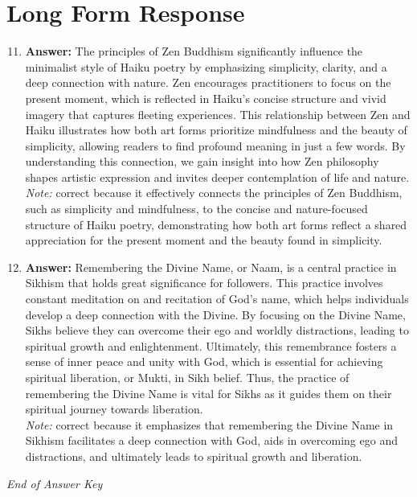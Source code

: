\documentclass[12pt]{article}
\begin{document}
\section*{Long Form Response}
\begin{enumerate}[label=\arabic*.]
\setcounter{enumi}{10}
\item \textbf{Answer:} The principles of Zen Buddhism significantly influence the minimalist style of Haiku poetry by emphasizing simplicity, clarity, and a deep connection with nature. Zen encourages practitioners to focus on the present moment, which is reflected in Haiku's concise structure and vivid imagery that captures fleeting experiences. This relationship between Zen and Haiku illustrates how both art forms prioritize mindfulness and the beauty of simplicity, allowing readers to find profound meaning in just a few words. By understanding this connection, we gain insight into how Zen philosophy shapes artistic expression and invites deeper contemplation of life and nature.
\\ \textit{Note:} correct because it effectively connects the principles of Zen Buddhism, such as simplicity and mindfulness, to the concise and nature-focused structure of Haiku poetry, demonstrating how both art forms reflect a shared appreciation for the present moment and the beauty found in simplicity.
\item \textbf{Answer:} Remembering the Divine Name, or Naam, is a central practice in Sikhism that holds great significance for followers. This practice involves constant meditation on and recitation of God's name, which helps individuals develop a deep connection with the Divine. By focusing on the Divine Name, Sikhs believe they can overcome their ego and worldly distractions, leading to spiritual growth and enlightenment. Ultimately, this remembrance fosters a sense of inner peace and unity with God, which is essential for achieving spiritual liberation, or Mukti, in Sikh belief. Thus, the practice of remembering the Divine Name is vital for Sikhs as it guides them on their spiritual journey towards liberation.
\\ \textit{Note:} correct because it emphasizes that remembering the Divine Name in Sikhism facilitates a deep connection with God, aids in overcoming ego and distractions, and ultimately leads to spiritual growth and liberation.
\end{enumerate}

\vfill
\noindent\textit{End of Answer Key}
\end{document}
